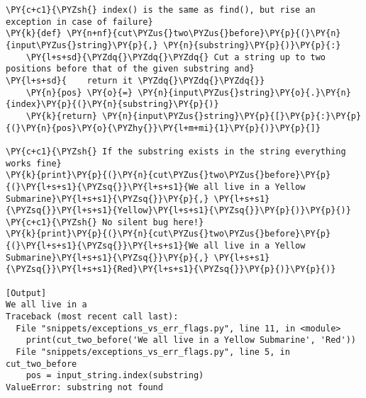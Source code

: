 \begin{Verbatim}[label=\makebox{\url{https://github.com/lucabaldini/cmepda/tree/master/slides/latex/snippets/exceptions\_vs\_err\_flags.py}},commandchars=\\\{\}]
\PY{c+c1}{\PYZsh{} index() is the same as find(), but rise an exception in case of failure}
\PY{k}{def} \PY{n+nf}{cut\PYZus{}two\PYZus{}before}\PY{p}{(}\PY{n}{input\PYZus{}string}\PY{p}{,} \PY{n}{substring}\PY{p}{)}\PY{p}{:}
    \PY{l+s+sd}{\PYZdq{}\PYZdq{}\PYZdq{} Cut a string up to two positions before that of the given substring and}
\PY{l+s+sd}{    return it \PYZdq{}\PYZdq{}\PYZdq{}}
    \PY{n}{pos} \PY{o}{=} \PY{n}{input\PYZus{}string}\PY{o}{.}\PY{n}{index}\PY{p}{(}\PY{n}{substring}\PY{p}{)}
    \PY{k}{return} \PY{n}{input\PYZus{}string}\PY{p}{[}\PY{p}{:}\PY{p}{(}\PY{n}{pos}\PY{o}{\PYZhy{}}\PY{l+m+mi}{1}\PY{p}{)}\PY{p}{]}

\PY{c+c1}{\PYZsh{} If the substring exists in the string everything works fine}
\PY{k}{print}\PY{p}{(}\PY{n}{cut\PYZus{}two\PYZus{}before}\PY{p}{(}\PY{l+s+s1}{\PYZsq{}}\PY{l+s+s1}{We all live in a Yellow Submarine}\PY{l+s+s1}{\PYZsq{}}\PY{p}{,} \PY{l+s+s1}{\PYZsq{}}\PY{l+s+s1}{Yellow}\PY{l+s+s1}{\PYZsq{}}\PY{p}{)}\PY{p}{)}
\PY{c+c1}{\PYZsh{} No silent bug here!}
\PY{k}{print}\PY{p}{(}\PY{n}{cut\PYZus{}two\PYZus{}before}\PY{p}{(}\PY{l+s+s1}{\PYZsq{}}\PY{l+s+s1}{We all live in a Yellow Submarine}\PY{l+s+s1}{\PYZsq{}}\PY{p}{,} \PY{l+s+s1}{\PYZsq{}}\PY{l+s+s1}{Red}\PY{l+s+s1}{\PYZsq{}}\PY{p}{)}\PY{p}{)}

[Output]
We all live in a
Traceback (most recent call last):
  File "snippets/exceptions_vs_err_flags.py", line 11, in <module>
    print(cut_two_before('We all live in a Yellow Submarine', 'Red'))
  File "snippets/exceptions_vs_err_flags.py", line 5, in cut_two_before
    pos = input_string.index(substring)
ValueError: substring not found
\end{Verbatim}
